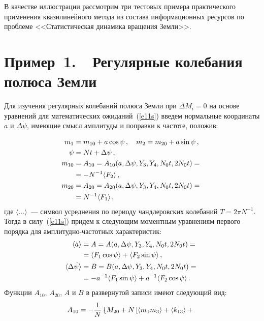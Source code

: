 \begin{multicols}{2}
В качестве иллюстрации рассмотрим три тес\-товых примера практического
применения квазилинейного метода из состава информационных ресур\-сов
по проблеме <<Статистическая динамика вращения Земли>>.

\section{Пример~1.\ \ Регулярные колебания полюса Земли} %

 Для изучения регулярных колебаний полюса Земли при $\Delta M_i=0$ на
 основе уравнений для математических ожиданий~(\ref{e11s}) введем нормальные координаты $a$ и $\Delta
 \dot\psi$, имеющие смысл амплитуды и поправки к частоте,
 положив:

 \noindent
\begin{align}
m_1 &= m_{10} +a \cos\psi\,,\quad m_2 = m_{20} +a \sin\psi\,,\notag\\
 \psi&= Nt +\Delta\psi\,, \notag\\ %
 m_{10} &= A_{10} = A_{10}( a,\Delta\psi, Y_3, Y_4, N_0 t, 2 N_0 t)={}\notag\\
&= - N^{-1} \langle F_2\rangle\,,\notag\\
 m_{20} &= A_{20} = A_{20}( a,\Delta\psi, Y_3, Y_4, N_0 t, 2 N_0 t)= {}\notag\\
&= N^{-1} \langle F_1\rangle\,,\label{e24s}
 \end{align}
где $\langle \ldots\rangle$~--- символ усреднения по периоду
чандлеровских колебаний $T =2 \pi N^{-1}$. Тогда в силу~(\ref{e11s}) придем
к следующим моментным уравнениям первого порядка для
амплитудно-частотных характеристик:
\begin{align}
\langle \dot a\rangle &= A = A( a,\Delta\psi, Y_3, Y_4, N_0 t, 2 N_0 t)={}\notag\\
&=\langle F_1\cos \psi\rangle+
 \langle F_2\sin \psi\rangle\,,\label{e25s}\\
\langle \Delta\dot \psi\rangle &= B = B( a,\Delta\psi, Y_3, Y_4, N_0 t, 2 N_0 t)={}\notag\\
&= -a^{-1}\langle F_1\sin \psi\rangle+a^{-1}
 \langle F_2\cos \psi\rangle\,.\label{e26s}
 \end{align}
Функции $A_{10}$, $A_{20}$, $A$ и $B$ в развернутой записи имеют
следующий вид:
\begin{multline}
A_{10} = -\fr{1}{N} \left\{
 M_{20} + N \left[ \langle m_1 m_3\rangle +\langle k_{13}\rangle + {}\right.\right.\\

\end{multline}
\end{multicols}
